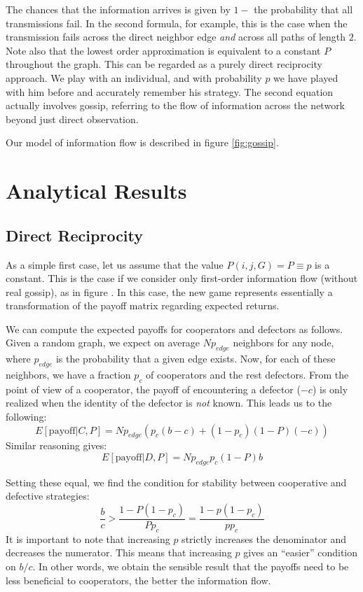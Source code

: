 \documentclass{article}
\renewcommand{\=}[1]{\stackrel{#1}{=}} %
\begin{document}
 The chances that the information arrives is given by
$1 - $ the probability that all transmissions fail. In the second
formula, for example, this is the case when the transmission fails
across the direct neighbor edge \emph{and} across all paths of length
$2$. Note also that the lowest order approximation is equivalent to a
constant $P$ throughout the graph. This can be regarded as a purely direct reciprocity approach.
We play with an individual, and with probability $p$ we have played with
him before and accurately remember his strategy. The second equation
actually involves gossip, referring to the flow of information across
the network beyond just direct observation.

Our model of information flow is described in figure \ref{fig:gossip}.

\section{Analytical Results}
\subsection{Direct Reciprocity}
As a simple first case, let us assume that the value
$P(i,j,G) = P \equiv p$ is a constant. This is the case if we consider only first-order information flow (without real gossip), as in figure \protect{}. In this case, the new game
represents essentially a transformation of the payoff matrix regarding
expected returns.

We can compute the expected payoffs for cooperators and defectors as
follows. Given a random graph, we expect on average $N p_{edge}$
neighbors for any node, where $p_{edge}$ is the probability that a given edge exists.
Now, for each of these neighbors, we have a fraction $p_c$ of
cooperators and the rest defectors. From the point of view of a cooperator, the payoff of encountering a
defector ($-c$) is only realized when the identity of the defector is
\emph{not} known. This leads us to the following:
\[E[\text{payoff}|C,P] = N p_{edge} \left(p_c (b - c) + (1 - p_c) (1 - P) (-c)\right)\]
Similar reasoning gives:
\[E[\text{payoff}|D,P] = N p_{edge} p_c(1- P) b\]

Setting these equal, we find the condition for stability between
cooperative and defective strategies:
\begin{equation}\label{eq:bc_threshold}
\frac{b}{c} > \frac{1 - P(1- p_c)}{Pp_c} = \frac{1 - p (1- p_c)}{p p_c}
\end{equation}
It is important to note that increasing $p$ strictly increases the denominator and decreases the numerator. This means that increasing $p$ gives an ``easier'' condition on $b/c$. In other words, we obtain the sensible result that the payoffs need to be less beneficial to cooperators, the better the information flow.
\end{document}
